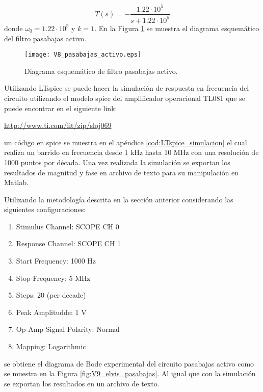 	\begin{equation}
		T(s) = - \frac{1.22 \cdot 10^{5}}{s + 1.22 \cdot 10^{5}}
	\end{equation}
	donde $\omega_{0} = 1.22 \cdot 10^{5} $ y $k = 1$. En la Figura \ref{fig:V8_pasabajas_activo} se muestra el diagrama esquemático del filtro pasabajas activo.
	
	\begin{figure}[hbtp]
		\caption{Diagrama esquemático de filtro pasabajas activo.}
		\label{fig:V8_pasabajas_activo}
		\centering
		\texttt{[image: V8\_pasabajas\_activo.eps]}
	\end{figure}
	
	Utilizando LTspice se puede hacer la simulación de respuesta en frecuencia del circuito utilizando el modelo spice del amplificador operacional TL081 que se puede encontrar en el siguiente link:
	
	\begin{center}
		\url{http://www.ti.com/lit/zip/sloj069}
	\end{center}
	un código en spice se muestra en el apéndice \ref{cod:LTspice_simulacion} el cual realiza un barrido en frecuencia desde 1 kHz hasta 10 MHz con una resolución de 1000 puntos por década. Una vez realizada la simulación se exportan los resultados de magnitud y fase en archivo de texto para su manipulación en Matlab.
	
	Utilizando la metodología descrita en la sección anterior considerando las siguientes configuraciones:
	\begin{multicols}{2}
	    \begin{enumerate}[label=\alph*.]
	    	\item Stimulus Channel: SCOPE CH 0
			\item Response Channel: SCOPE CH 1 
			\item Start Frequency:	1000 Hz
			\item Stop Frequency:	5 MHz
			\item Steps:			20 (per decade)
			\item Peak Amplitudde:	1 V
			\item Op-Amp Signal Polarity: Normal
			\item Mapping:			Logarithmic
	    \end{enumerate}
	\end{multicols}
	\noindent
	se obtiene el diagrama de Bode experimental del circuito pasabajas activo como se muestra en la Figura \ref{fig:V9_elvis_pasabajas}. Al igual que con la simulación se exportan los resultados en un archivo de texto.
	
